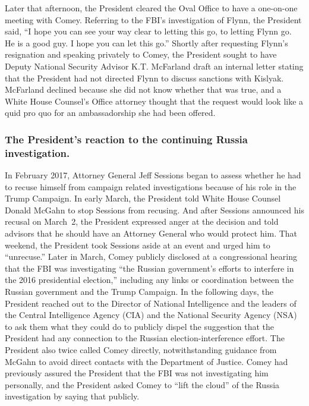 Later that afternoon, the President cleared the Oval Office to have a one-on-one meeting with Comey.
Referring to the FBI’s investigation of Flynn, the President said, “I hope you can see your way clear to letting this go, to letting Flynn go.
He is a good guy.
I hope you can let this go.”
Shortly after requesting Flynn’s resignation and speaking privately to Comey, the President sought to have Deputy National Security Advisor K.T. McFarland draft an internal letter stating that the President had not directed Flynn to discuss sanctions with Kislyak.
McFarland declined because she did not know whether that was true, and a White House Counsel’s Office attorney thought that the request would look like a quid pro quo for an ambassadorship she had been offered.

\subsubsection*{The President’s reaction to the continuing Russia investigation.}

In February 2017, Attorney General Jeff Sessions began to assess whether he had to recuse himself from campaign related investigations because of his role in the Trump Campaign.
In early March, the President told White House Counsel Donald McGahn to stop Sessions from recusing.
And after Sessions announced his recusal on March~2, the President expressed anger at the decision and told advisors that he should have an Attorney General who would protect him.
That weekend, the President took Sessions aside at an event and urged him to “unrecuse.”
Later in March, Comey publicly disclosed at a congressional hearing that the FBI was investigating “the Russian government’s efforts to interfere in the 2016 presidential election,” including any links or coordination between the Russian government and the Trump Campaign.
In the following days, the President reached out to the Director of National Intelligence and the leaders of the Central Intelligence Agency (CIA) and the National Security Agency (NSA) to ask them what they could do to publicly dispel the suggestion that the President had any connection to the Russian election-interference effort.
The President also twice called Comey directly, notwithstanding guidance from McGahn to avoid direct contacts with the Department of Justice.
Comey had previously assured the President that the FBI was not investigating him personally, and the President asked Comey to “lift the cloud” of the Russia investigation by saying that publicly.


